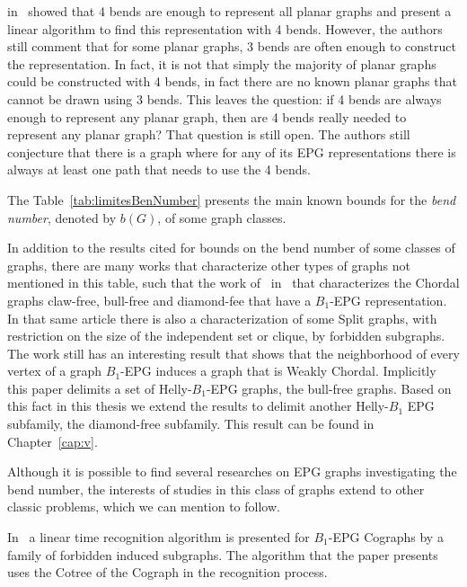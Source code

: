 \citeauthor{daniel2014b} in~\cite{daniel2014b} showed that 4 bends are enough to represent all planar graphs and present a linear algorithm to find this representation with 4 bends. However, the authors still comment that for some planar graphs, 3 bends are often enough to construct the representation. In fact, it is not that simply the majority of planar graphs could be constructed with 4 bends, in fact there are no known planar graphs that cannot be drawn using 3 bends. This leaves the question: if 4 bends are always enough to represent any planar graph, then are 4 bends really needed to represent any planar graph? That question is still open. The authors still conjecture that there is a graph where for any of its EPG representations there is always at least one path that needs to use the 4 bends.


The Table~\ref{tab:limitesBenNumber} presents the main known bounds for the \emph{bend number}, denoted by $b(G)$, of some graph classes.





In addition to the results cited for bounds on the bend number of some classes of graphs, there are many works that characterize other types of graphs not mentioned in this table, such that the work of~\citeauthor{ries2009} in~\citep{ries2009} that characterizes the Chordal graphs  claw-free, bull-free and diamond-fee that have a $ B_{1}$-EPG representation. In that same article there is also a characterization of some Split graphs, with restriction on the size of the independent set or  clique, by forbidden subgraphs. The work still has an interesting result that shows that the neighborhood of every vertex of a graph $ B_1$-EPG induces a graph that is Weakly Chordal. Implicitly this paper delimits a set of Helly-$B_1$-EPG graphs, the bull-free graphs. Based on this fact in this thesis we extend the results to delimit another Helly-$B_1$ EPG subfamily, the diamond-free subfamily. This result can be found in Chapter~\ref{cap:v}.

Although it is possible to find several researches on EPG graphs investigating the bend number, the interests of studies in this class of graphs extend to other classic problems, which we can mention to follow.


In~\citet{cohen2014} a linear time recognition algorithm is presented for $ B_{1}$-EPG Cographs by a family of forbidden induced subgraphs. The algorithm that the paper presents uses the Cotree of the Cograph in the recognition process.

